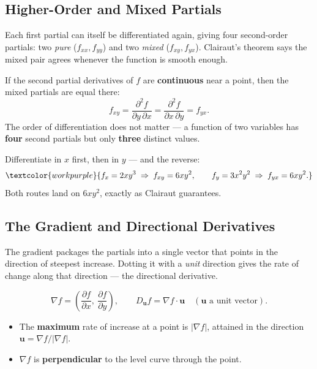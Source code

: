 \subsection{Higher-Order and Mixed Partials}

Each first partial can itself be differentiated again, giving four second-order
partials: two \emph{pure} ($f_{xx},f_{yy}$) and two \emph{mixed}
($f_{xy},f_{yx}$). Clairaut's theorem says the mixed pair agrees whenever the
function is smooth enough.

\begin{formulabox}
If the second partial derivatives of $f$ are \textbf{continuous} near a point,
then the mixed partials are equal there:
\[ f_{xy} = \frac{\partial^2 f}{\partial y\,\partial x}
          = \frac{\partial^2 f}{\partial x\,\partial y} = f_{yx}. \]
The order of differentiation does not matter --- a function of two variables has
\textbf{four} second partials but only \textbf{three} distinct values.
\end{formulabox}

\begin{examplebox}[Worked Example 6.2: Mixed partials of $f=x^2y^3$]
Differentiate in $x$ first, then in $y$ --- and the reverse:
\[ \textcolor{workpurple}{f_x = 2xy^3 \;\Rightarrow\; f_{xy} = 6xy^2,
   \qquad f_y = 3x^2y^2 \;\Rightarrow\; f_{yx} = 6xy^2.} \]
Both routes land on $6xy^2$, exactly as Clairaut guarantees.
\end{examplebox}

\subsection{The Gradient and Directional Derivatives}

The gradient packages the partials into a single vector that points in the
direction of steepest increase. Dotting it with a \emph{unit} direction gives
the rate of change along that direction --- the directional derivative.

\begin{formulabox}
\[ \nabla f = \left(\frac{\partial f}{\partial x},\ \frac{\partial f}{\partial y}\right),
   \qquad
   D_{\mathbf u} f = \nabla f \cdot \mathbf u \quad(\mathbf u \text{ a unit vector}). \]
\begin{itemize}[leftmargin=1.4em, itemsep=2pt]
    \item The \textbf{maximum} rate of increase at a point is $\lvert\nabla f\rvert$,
          attained in the direction $\mathbf u = \nabla f/\lvert\nabla f\rvert$.
    \item $\nabla f$ is \textbf{perpendicular} to the level curve through the point.
\end{itemize}
\end{formulabox}

